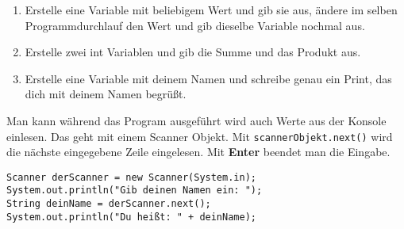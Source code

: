 \documentclass{../../sheet}
\begin{document}
\begin{enumerate}
\begin{ausgabe}
              .............................@@@*........@@@.................................
              ............................@@@@..........@@@................................
              ...........................@@@@............@@@...............................
              ......................\#@@@@@@@.............:@@@..............................
              ....................@@@@@@@@@@..............+@@@.............................
              ...................=@@@@..@@@@@@@@@@@@@@@@@@@@@@@............................
              ...................@@@@....@@@@.:.............@@@*...........................
              ....................@@@@@@@@@@\#................@@@:..........................
              .....................@@@@@@@@...................@@@..........................
              .............................................................................
          \end{ausgabe}
    \item Erstelle eine Variable mit beliebigem Wert und gib sie aus, ändere im selben Programmdurchlauf den Wert und gib dieselbe Variable nochmal aus.
    \item Erstelle zwei int Variablen und gib die Summe und das Produkt aus.
    \item Erstelle eine Variable mit deinem Namen und schreibe genau ein Print, das dich mit deinem Namen begrüßt.
\end{enumerate}

\newpage
{}
Man kann während das Program ausgeführt wird auch Werte aus der Konsole einlesen. Das geht mit einem Scanner Objekt. Mit \texttt{scannerObjekt.next()} wird die nächste eingegebene Zeile eingelesen. Mit \textbf{Enter} beendet man die Eingabe.
\begin{verbatim}
Scanner derScanner = new Scanner(System.in);
System.out.println("Gib deinen Namen ein: ");
String deinName = derScanner.next();
System.out.println("Du heißt: " + deinName);
\end{verbatim}
\end{document}
